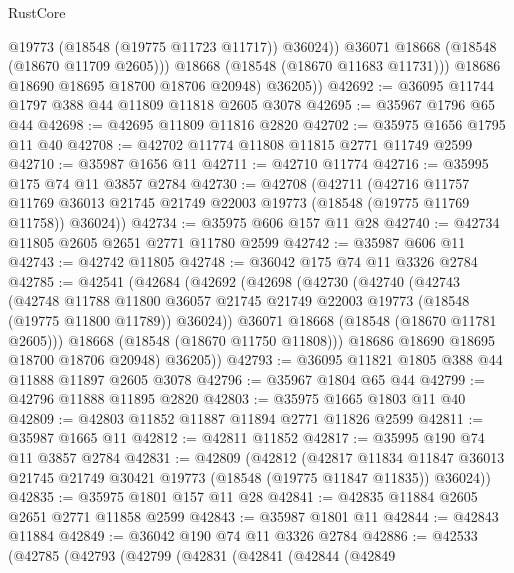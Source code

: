 \begin{lexlean}{RustCore}
\begin{coremodule}
                  @19773
                  (@18548 (@19775 @11723 @11717))
                  @36024))
              @36071
              @18668
              (@18548 (@18670 @11709 @2605)))
            @18668
            (@18548 (@18670 @11683 @11731)))
          @18686
          @18690
          @18695
          @18700
          @18706
          @20948)
        @36205))
@42692 := @36095 @11744 @1797 @388 @44 @11809 @11818 @2605 @3078
@42695 := @35967 @1796 @65 @44
@42698 := @42695 @11809 @11816 @2820
@42702 := @35975 @1656 @1795 @11 @40
@42708 := @42702 @11774 @11808 @11815 @2771 @11749 @2599
@42710 := @35987 @1656 @11
@42711 := @42710 @11774
@42716 := @35995 @175 @74 @11 @3857 @2784
@42730 := @42708
    (@42711
      (@42716
        @11757
        @11769
        @36013
        @21745
        @21749
        @22003
        @19773
        (@18548 (@19775 @11769 @11758))
        @36024))
@42734 := @35975 @606 @157 @11 @28
@42740 := @42734 @11805 @2605 @2651 @2771 @11780 @2599
@42742 := @35987 @606 @11
@42743 := @42742 @11805
@42748 := @36042 @175 @74 @11 @3326 @2784
@42785 := @42541
    (@42684
      (@42692
        (@42698
          (@42730
            (@42740
              (@42743
                (@42748
                  @11788
                  @11800
                  @36057
                  @21745
                  @21749
                  @22003
                  @19773
                  (@18548 (@19775 @11800 @11789))
                  @36024))
              @36071
              @18668
              (@18548 (@18670 @11781 @2605)))
            @18668
            (@18548 (@18670 @11750 @11808)))
          @18686
          @18690
          @18695
          @18700
          @18706
          @20948)
        @36205))
@42793 := @36095 @11821 @1805 @388 @44 @11888 @11897 @2605 @3078
@42796 := @35967 @1804 @65 @44
@42799 := @42796 @11888 @11895 @2820
@42803 := @35975 @1665 @1803 @11 @40
@42809 := @42803 @11852 @11887 @11894 @2771 @11826 @2599
@42811 := @35987 @1665 @11
@42812 := @42811 @11852
@42817 := @35995 @190 @74 @11 @3857 @2784
@42831 := @42809
    (@42812
      (@42817
        @11834
        @11847
        @36013
        @21745
        @21749
        @30421
        @19773
        (@18548 (@19775 @11847 @11835))
        @36024))
@42835 := @35975 @1801 @157 @11 @28
@42841 := @42835 @11884 @2605 @2651 @2771 @11858 @2599
@42843 := @35987 @1801 @11
@42844 := @42843 @11884
@42849 := @36042 @190 @74 @11 @3326 @2784
@42886 := @42533
    (@42785
      (@42793
        (@42799
          (@42831
            (@42841
              (@42844
                (@42849

\end{coremodule}
\end{lexlean}
